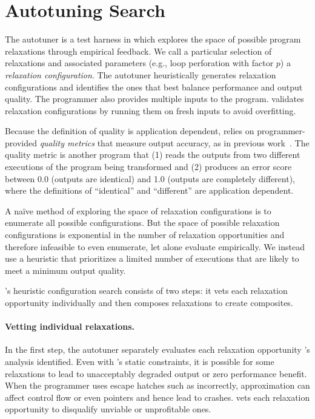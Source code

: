 \section{Autotuning Search}
\label{sec:autotuner}

The autotuner is a test harness in which \sysname explores the space of possible
program relaxations through empirical feedback.  We call
a particular selection of relaxations and associated parameters (e.g., loop
perforation with factor $p$) a \emph{relaxation configuration}.  The
autotuner heuristically generates relaxation configurations and identifies the
ones that best balance performance and output quality.
%
The programmer also provides multiple inputs to the program.  \sysname validates
relaxation configurations by running them on fresh inputs to avoid overfitting.

Because the definition of quality is application dependent, \sysname relies on
programmer-provided \emph{quality metrics} that measure output
accuracy, as in previous work~\cite{enerj, truffle, qosprof, carbin-pldi, green,
npu}.
The quality metric is another program that (1) reads the outputs
from two different executions of the program being transformed and (2) produces
an error score between 0.0 (outputs are identical) and 1.0 (outputs are
completely different), where the definitions of ``identical'' and ``different''
are application dependent.

A na\"ive method of exploring the space of relaxation configurations is to
enumerate all possible configurations.
But the space of possible relaxation configurations is exponential in the number
of relaxation opportunities and therefore infeasible to even enumerate, let
alone evaluate empirically.
We instead use a heuristic that prioritizes a limited number of
executions that are likely to meet a minimum output quality.

\sysname's heuristic configuration search consists of two steps: it vets each
relaxation opportunity individually and then composes relaxations to create
composites.

\paragraph{Vetting individual relaxations.}
In the first step, the autotuner separately evaluates each
relaxation opportunity \sysname's analysis identified. Even with \sysname's
static constraints, it is
possible for some relaxations to lead to unacceptably degraded output or
zero performance benefit.
When the programmer uses escape hatches such as 
incorrectly, approximation can affect control flow or even pointers and
hence lead to crashes.
\sysname vets each
relaxation opportunity to disqualify unviable or unprofitable ones.


